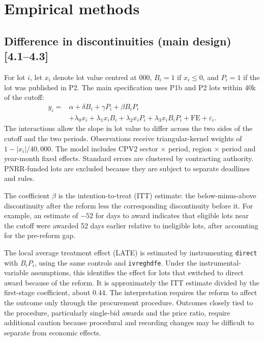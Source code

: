 \documentclass[11pt,a4paper]{article}
\newcommand{\code}[1]{\texttt{\small #1}}
\newcommand{\sect}[1]{\textsf{\small [#1]}}
\begin{document}
\section{Empirical methods}
\label{sec:methods}

\subsection{Difference in discontinuities (main design) \sect{4.1--4.3}}

For lot $i$, let $x_i$ denote lot value centred at 000, $B_i = 1$ if $x_i \le 0$, and $P_i = 1$ if the lot was published in P2. The main specification uses P1b and P2 lots within \texteuro40k of the cutoff:
\[
\begin{aligned}
y_i ={}& \alpha + \delta B_i + \gamma P_i + \beta B_iP_i \\
       &+ \lambda_0 x_i + \lambda_1 x_iB_i + \lambda_2 x_iP_i
        + \lambda_3 x_iB_iP_i + \mathrm{FE} + \varepsilon_i.
\end{aligned}
\]
The interactions allow the slope in lot value to differ across the two sides of the cutoff and the two periods. Observations receive triangular-kernel weights of $1-|x_i|/40{,}000$. The model includes CPV2 sector $\times$ period, region $\times$ period and year-month fixed effects. Standard errors are clustered by contracting authority. PNRR-funded lots are excluded because they are subject to separate deadlines and rules.

The coefficient $\beta$ is the intention-to-treat (ITT) estimate: the below-minus-above discontinuity after the reform less the corresponding discontinuity before it. For example, an estimate of $-52$ for days to award indicates that eligible lots near the cutoff were awarded 52 days earlier relative to ineligible lots, after accounting for the pre-reform gap.

The local average treatment effect (LATE) is estimated by instrumenting \code{direct} with $B_iP_i$, using the same controls and \code{ivreghdfe}. Under the instrumental-variable assumptions, this identifies the effect for lots that switched to direct award because of the reform. It is approximately the ITT estimate divided by the first-stage coefficient, about 0.44. The interpretation requires the reform to affect the outcome only through the procurement procedure. Outcomes closely tied to the procedure, particularly single-bid awards and the price ratio, require additional caution because procedural and recording changes may be difficult to separate from economic effects.
\end{document}
